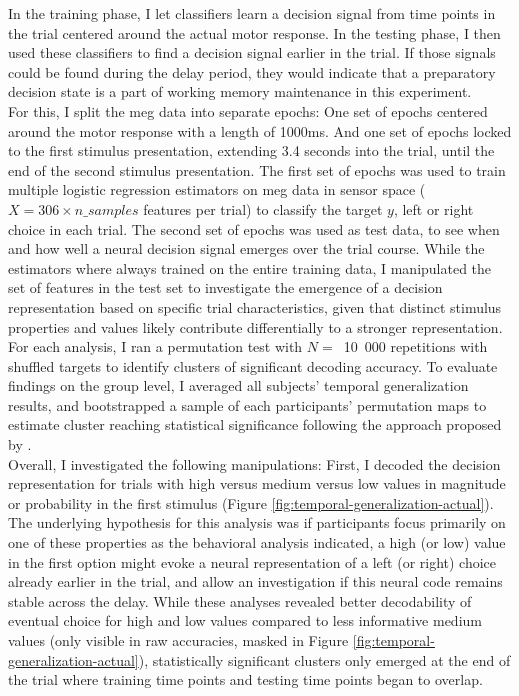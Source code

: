 In the training phase, I let classifiers learn a decision signal from time points in the trial centered around the actual motor response.
In the testing phase, I then used these classifiers to find a decision signal earlier in the trial.
If those signals could be found during the delay period, they would indicate that a preparatory decision state is a part of working memory maintenance in this experiment. \\
For this, I split the \gls{meg} data into separate epochs:
One set of epochs centered around the motor response with a length of 1000ms.
And one set of epochs locked to the first stimulus presentation, extending 3.4 seconds into the trial, until the end of the second stimulus presentation.
The first set of epochs was used to train multiple logistic regression estimators on \gls{meg} data in sensor space ($X=306 \times n\_samples$ features per trial) to classify the target $y$, left or right choice in each trial.
The second set of epochs was used as test data, to see when and how well a neural decision signal emerges over the trial course.
While the estimators where always trained on the entire training data, I manipulated the set of features in the test set to investigate the emergence of a decision representation based on specific trial characteristics, given that distinct stimulus properties and values likely contribute differentially to a stronger representation.
For each analysis, I ran a permutation test with $N=$~10~000 repetitions with shuffled targets to identify clusters of significant decoding accuracy.
To evaluate findings on the group level, I averaged all subjects' temporal generalization results, and bootstrapped a sample of each participants' permutation maps to estimate cluster reaching statistical significance following the approach proposed by \citet{stelzer2013statistical}.\\
Overall, I investigated the following manipulations:
First, I decoded the decision representation for trials with high versus medium versus low values in magnitude or probability in the first stimulus (Figure \ref{fig:temporal-generalization-actual}).
The underlying hypothesis for this analysis was if participants focus primarily on one of these properties as the behavioral analysis indicated, a high (or low) value in the first option might evoke a neural representation of a left (or right) choice already earlier in the trial, and allow an investigation if this neural code remains stable across the delay.
While these analyses revealed better decodability of eventual choice for high and low values compared to less informative medium values (only visible in raw accuracies, masked in Figure \ref{fig:temporal-generalization-actual}), statistically significant clusters only emerged at the end of the trial where training time points and testing time points began to overlap.



